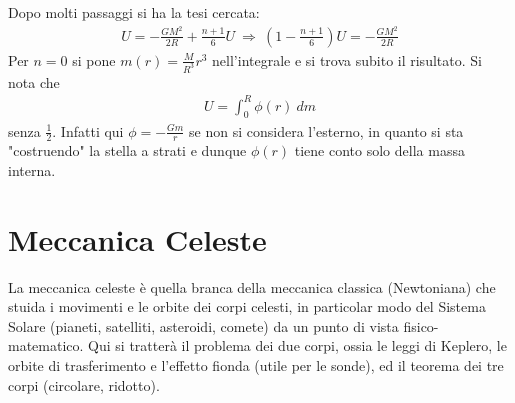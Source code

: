 \documentclass[a4paper, oneside]{book}
\begin{document}
Dopo molti passaggi si ha la tesi cercata: 
\begin{gather*}
    U = -\frac{GM^{2}}{2R} + \frac{n + 1}{6}U \ \Longrightarrow \ \left(1 - \frac{n + 1}{6}\right)U = - \frac{GM^{2}}{2R}
\end{gather*}
Per $n = 0$ si pone $m(r) = \frac{M}{R^{3}}r^{3}$ 
nell'integrale e si trova subito il risultato. Si nota che 
\begin{gather*}
    U = \int_{0}^{R} \phi(r) \ dm 
\end{gather*}
senza $\frac{1}{2}$. Infatti qui $\phi = -\frac{Gm}{r}$ se non si considera l'esterno, 
in quanto si sta "costruendo" la stella a strati e dunque $\phi(r)$ tiene conto solo della 
massa interna.


\chapter{Meccanica Celeste}
La meccanica celeste è quella branca della meccanica classica (Newtoniana)
che stuida i movimenti e le orbite dei corpi celesti, in particolar modo 
del Sistema Solare (pianeti, satelliti, asteroidi, comete) da un punto di 
vista fisico-matematico. Qui si tratterà il problema dei due corpi, 
ossia le leggi di Keplero, le orbite di trasferimento 
e l'effetto fionda (utile per le sonde), ed il teorema dei tre corpi (circolare, ridotto). 
\end{document}
